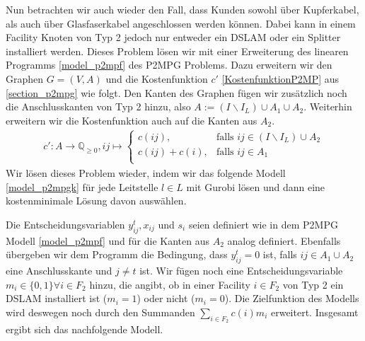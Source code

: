 \documentclass[11pt,a4paper]{article}
\newcommand{\Q}{\mathbb{Q}}
\theoremstyle{my_th_style1}
\begin{document}
Nun betrachten wir auch wieder den Fall, dass Kunden sowohl \"uber Kupferkabel, als auch \"uber Glasfaserkabel angeschlossen werden k\"onnen.
Dabei kann in einem Facility Knoten von Typ 2 jedoch nur entweder ein DSLAM oder ein Splitter installiert werden.
Dieses Problem lösen wir mit einer Erweiterung des linearen Programms \ref{model_p2mpf} des P2MPG Problems.
Dazu erweitern wir den Graphen \(G = (V,A)\) und die Kostenfunktion \(c'\) \eqref{KostenfunktionP2MP} aus \ref{section_p2mpg} wie folgt.
Den Kanten des Graphen f\"ugen wir zus\"atzlich noch die Anschlusskanten von Typ 2 hinzu, also \(A := (I \backslash I_L ) \cup A_1 \cup A_2\).
Weiterhin erweitern wir die Kostenfunktion auch auf die Kanten aus \(A_2\).
\begin{align}
\label{KostenfunktionP2MPGK}
c': A \rightarrow \Q_{ \geq 0}, ij  \mapsto \left\{\begin{array}{cl} 
c(ij), & \text{falls } ij \in (I\backslash I_L) \cup A_2\\ 
c(ij)+c(i), & \text{falls } ij \in A_1\\ 
\end{array}
\right.
\end{align}
Wir l\"osen dieses Problem wieder, indem wir das folgende Modell \ref{model_p2mpgk} für jede Leitstelle $l \in L $ mit Gurobi \cite{gurobi} lösen und dann eine kostenminimale L\"osung davon ausw\"ahlen.

Die Entscheidungsvariablen $y_{ij}^t,x_{ij}$ und $s_i$ seien definiert wie in dem P2MPG Modell \ref{model_p2mpf} und f\"ur die Kanten aus \(A_2\) analog definiert.
Ebenfalls \"ubergeben wir dem Programm die Bedingung, dass \(y_{ij}^t = 0\) ist, falls \(ij \in A_1 \cup A_2\) eine Anschlusskante und \(j \neq t\) ist.
Wir fügen noch eine Entscheidungsvariable $m_i \in \{0,1\} \forall i \in F_2$ hinzu, die angibt, ob in einer Facility \(i \in F_2\) von Typ 2 ein DSLAM installiert ist (\(m_i = 1\)) oder nicht (\(m_i = 0\)).
Die Zielfunktion des Modells wird deswegen noch durch den Summanden $\displaystyle\sum_{i \in F_2} c(i) m_i$ erweitert.
Insgesamt ergibt sich das nachfolgende Modell.
\end{document}
